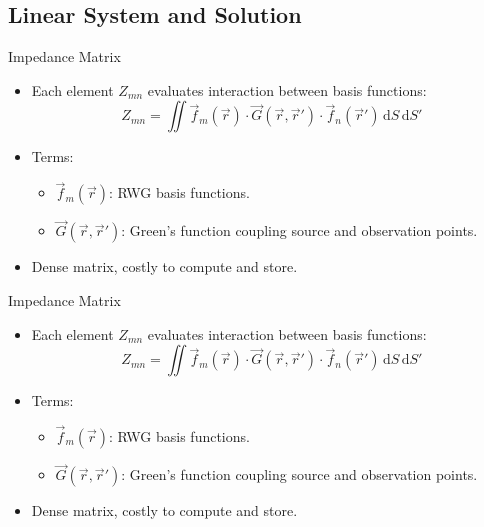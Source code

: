 \subsection{Linear System and Solution}
\begin{frame}{Impedance Matrix}
    \begin{itemize}
        \item Each element \(Z_{mn}\) evaluates interaction between basis functions:
            \begin{equation}
            Z_{mn} = \iint \vec{f}_m(\vec{r}) \cdot \vec{G}(\vec{r}, \vec{r}') \cdot \vec{f}_n(\vec{r}') \, \text{d}S \, \text{d}S' \tag{2}
            \end{equation}
        \item Terms:
            \begin{itemize}
                \item \(\vec{f}_m(\vec{r})\): RWG basis functions.
                \item \(\vec{G}(\vec{r}, \vec{r}')\): Green's function coupling source and observation points.
            \end{itemize}
        \item Dense matrix, costly to compute and store.
    \end{itemize}
\end{frame}

\begin{frame}{Impedance Matrix}
    \begin{itemize}
        \item Each element \(Z_{mn}\) evaluates interaction between basis functions:
            \begin{equation}
            Z_{mn} = \iint \vec{f}_m(\vec{r}) \cdot \vec{G}(\vec{r}, \vec{r}') \cdot \vec{f}_n(\vec{r}') \, \text{d}S \, \text{d}S' \tag{2}
            \end{equation}
        \item Terms:
            \begin{itemize}
                \item \(\vec{f}_m(\vec{r})\): RWG basis functions.
                \item \(\vec{G}(\vec{r}, \vec{r}')\): Green's function coupling source and observation points.
            \end{itemize}
        \item Dense matrix, costly to compute and store.
    \end{itemize}
\end{frame}

